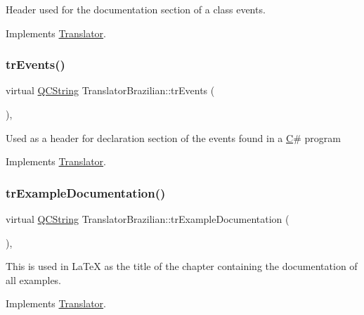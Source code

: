 Header used for the documentation section of a class\textquotesingle{} events. 

Implements \mbox{\hyperlink{class_translator}{Translator}}.

\mbox{\label{class_translator_brazilian_aec10651691524b1eb605047c5753dbfd}} 
\subsubsection{\texorpdfstring{trEvents()}{trEvents()}}
{\footnotesize\ttfamily virtual \mbox{\hyperlink{class_q_c_string}{Q\+C\+String}} Translator\+Brazilian\+::tr\+Events (\begin{DoxyParamCaption}{ }\end{DoxyParamCaption})\hspace{0.3cm}{\ttfamily [inline]}, {\ttfamily [virtual]}}

Used as a header for declaration section of the events found in a \mbox{\hyperlink{class_c}{C}}\# program 

Implements \mbox{\hyperlink{class_translator}{Translator}}.

\mbox{\label{class_translator_brazilian_afb5619b984448f4b60c2e067367f1f32}} 
\subsubsection{\texorpdfstring{trExampleDocumentation()}{trExampleDocumentation()}}
{\footnotesize\ttfamily virtual \mbox{\hyperlink{class_q_c_string}{Q\+C\+String}} Translator\+Brazilian\+::tr\+Example\+Documentation (\begin{DoxyParamCaption}{ }\end{DoxyParamCaption})\hspace{0.3cm}{\ttfamily [inline]}, {\ttfamily [virtual]}}

This is used in La\+TeX as the title of the chapter containing the documentation of all examples. 

Implements \mbox{\hyperlink{class_translator}{Translator}}.


